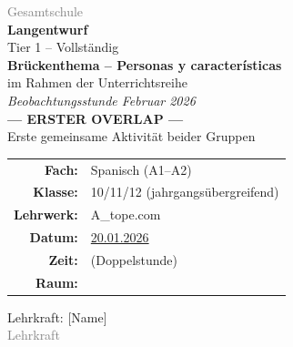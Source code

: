 \documentclass[11pt,a4paper]{article}
\newcommand{\fach}{Spanisch}
\newcommand{\jahrgangsstufe}{10/11/12 (jahrgangsübergreifend)}
\newcommand{\schulart}{Gesamtschule}
\newcommand{\stundenthema}{Brückenthema -- Personas y características}
\newcommand{\reihenthema}{Beobachtungsstunde Februar 2026}
\newcommand{\unterrichtsdatum}{20.01.2026}
\newcommand{\lehrkraft}{[Name]}
\newcommand{\ausbildungsstand}{Lehrkraft}
\newcommand{\gerniveau}{A1--A2}
\newcommand{\lehrwerk}{A\_tope.com}
\begin{document}
\begin{titlepage}
    \centering
    \vspace*{2cm}

    {\large\textcolor{gray}{\schulart}}\\[2cm]

    {\Huge\textcolor{fach}{\textbf{Langentwurf}}}\\[0.5cm]
    {\large Tier 1 -- Vollständig}\\[2cm]

    {\LARGE\textbf{\stundenthema}}\\[0.5cm]
    {\large im Rahmen der Unterrichtsreihe}\\[0.3cm]
    {\Large\textit{\reihenthema}}\\[1cm]

    \textcolor{overlap}{\Large\textbf{--- ERSTER OVERLAP ---}}\\[0.3cm]
    {\normalsize Erste gemeinsame Aktivität beider Gruppen}\\[1.5cm]

    \begin{tabular}{rl}
        \textbf{Fach:} & \fach{} (\gerniveau) \\[0.3cm]
        \textbf{Klasse:} & \jahrgangsstufe \\[0.3cm]
        \textbf{Lehrwerk:} & \lehrwerk \\[0.3cm]
        \textbf{Datum:} & \underline{\hspace{1cm}\unterrichtsdatum\hspace{1cm}} \\[0.3cm]
        \textbf{Zeit:} & \underline{\hspace{3cm}} (Doppelstunde) \\[0.3cm]
        \textbf{Raum:} & \underline{\hspace{3cm}} \\[0.3cm]
    \end{tabular}

    \vfill

    {\large Lehrkraft: \lehrkraft}\\[0.3cm]
    {\normalsize\textcolor{gray}{\ausbildungsstand}}\\[1cm]

\end{titlepage}

\tableofcontents
\newpage
\end{document}
